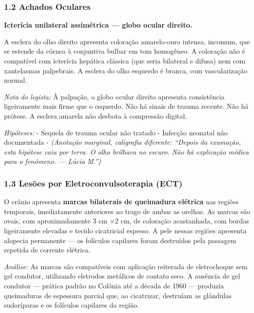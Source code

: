 \subsubsection*{1.2 Achados Oculares}

\noindent \textbf{Icterícia unilateral assimétrica --- globo ocular direito.}

\noindent A esclera do olho direito apresenta coloração amarelo-ouro intensa, incomum, que se estende da córnea à conjuntiva bulbar em tom homogêneo. A coloração não é compatível com icterícia hepática clássica (que seria bilateral e difusa) nem com xantelasmas palpebrais. A esclera do olho esquerdo é branca, com vascularização normal.

\noindent \textit{Nota do legista:} À palpação, o globo ocular direito apresenta consistência ligeiramente mais firme que o esquerdo. Não há sinais de trauma recente. Não há prótese. A esclera amarela não desbota à compressão digital.

\noindent \textit{Hipóteses:}
- Sequela de trauma ocular não tratado
- Infecção neonatal não documentada
- \textit{(Anotação marginal, caligrafia diferente: ``Depois da exumação, esta hipótese caiu por terra. O olho brilhava no escuro. Não há explicação médica para o fenômeno. --- Lúcia M.'')}

\subsubsection*{1.3 Lesões por Eletroconvulsoterapia (ECT)}

\noindent O crânio apresenta \textbf{marcas bilaterais de queimadura elétrica} nas regiões temporais, imediatamente anteriores ao trago de ambas as orelhas. As marcas são ovais, com aproximadamente 3 cm ×2 cm, de coloração acastanhada, com bordas ligeiramente elevadas e tecido cicatricial espesso. A pele nessas regiões apresenta alopecia permanente --- os folículos capilares foram destruídos pela passagem repetida de corrente elétrica.

\noindent \textit{Análise:} As marcas são compatíveis com aplicação reiterada de eletrochoque sem gel condutor, utilizando eletrodos metálicos de contato seco. A ausência de gel condutor --- prática padrão no Colônia até a década de 1960 --- produzia queimaduras de espessura parcial que, ao cicatrizar, destruíam as glândulas sudoríparas e os folículos capilares da região.

